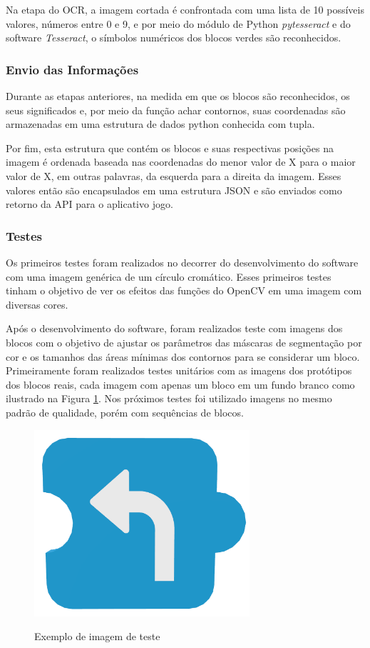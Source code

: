     Na etapa do OCR, a imagem cortada é confrontada com uma lista de 10 possíveis valores, números entre 0 e 9, e por meio do módulo de Python \textit{pytesseract} e do software \textit{Tesseract}, o símbolos numéricos dos blocos verdes são reconhecidos.


    \subsubsection{Envio das Informações}
    Durante as etapas anteriores, na medida em que os blocos são reconhecidos, os seus significados e, por meio da função achar contornos, suas coordenadas são armazenadas em uma estrutura de dados python conhecida com tupla.
    
    Por fim, esta estrutura que contém os blocos e suas respectivas posições na imagem é ordenada baseada nas coordenadas do menor valor de X para o maior valor de X, em outras palavras, da esquerda para a direita da imagem. Esses valores então são  encapsulados em uma estrutura JSON e são enviados como retorno da API para o aplicativo jogo.

    \subsubsection{Testes}
    
    Os primeiros testes foram realizados no decorrer do desenvolvimento do software com uma imagem genérica de um círculo cromático. Esses primeiros testes tinham o objetivo de ver os efeitos das funções do OpenCV em uma imagem com diversas cores.
    
    Após o desenvolvimento do software, foram realizados teste com imagens dos blocos com o objetivo de ajustar os parâmetros das máscaras de segmentação por cor e os tamanhos das áreas mínimas dos contornos para se considerar um bloco. Primeiramente foram realizados testes unitários com as imagens dos protótipos dos blocos reais, cada imagem com apenas um bloco em um fundo branco como ilustrado na Figura \ref{figura:ex_teste}. Nos próximos testes foi utilizado imagens no mesmo padrão de qualidade, porém com sequências de blocos.
    
       
    \begin{figure}[H]
        \caption{Exemplo de imagem de teste}
        \centering
        \includegraphics[width=8cm]{Imagens/Cap3/Blocos/Virar.png}
        \label{figura:ex_teste}
    \end{figure}
    
